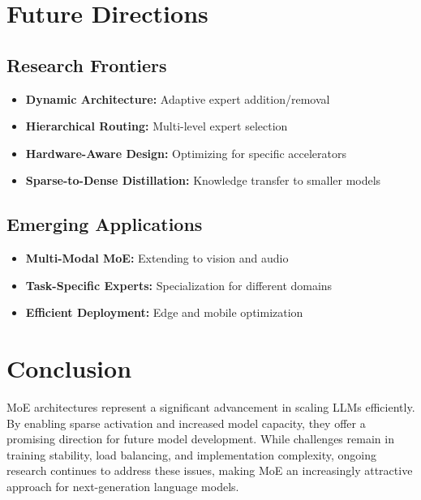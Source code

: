 \section{Future Directions}
\label{sec:moe_future}

\subsection{Research Frontiers}
\begin{itemize}
    \item \textbf{Dynamic Architecture:} Adaptive expert addition/removal
    \item \textbf{Hierarchical Routing:} Multi-level expert selection
    \item \textbf{Hardware-Aware Design:} Optimizing for specific accelerators
    \item \textbf{Sparse-to-Dense Distillation:} Knowledge transfer to smaller models
\end{itemize}

\subsection{Emerging Applications}
\begin{itemize}
    \item \textbf{Multi-Modal MoE:} Extending to vision and audio
    \item \textbf{Task-Specific Experts:} Specialization for different domains
    \item \textbf{Efficient Deployment:} Edge and mobile optimization
\end{itemize}

\section{Conclusion}
\noindent
MoE architectures represent a significant advancement in scaling LLMs efficiently. By enabling sparse activation and increased model capacity, they offer a promising direction for future model development. While challenges remain in training stability, load balancing, and implementation complexity, ongoing research continues to address these issues, making MoE an increasingly attractive approach for next-generation language models.

\nocite{shazeer2017outrageously, lepikhin2020gshard, fedus2021switch, du2021glam, mistral2023mixtral}